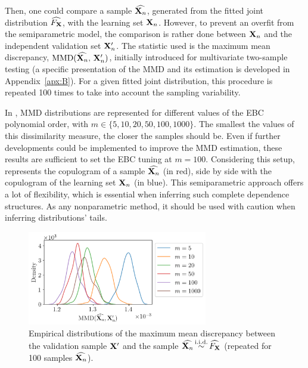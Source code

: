 Then, one could compare a sample $\widehat{{\bf X}_n}$, generated from the fitted joint distribution $\widehat{F_{\bf X}}$, with the learning set ${\bf X}_n$. 
However, to prevent an overfit from the semiparametric model, the comparison is rather done between ${\bf X}_n$ and the independent validation set ${\bf X}_n'$. 
The statistic used is the maximum mean discrepancy, $\mathrm{MMD}(\widehat{{\bf X}_n}, \, {\bf X}_n')$, initially introduced for multivariate two-sample testing (a specific presentation of the MMD and its estimation is developed in Appendix~\ref{apx:B}). 
For a given fitted joint distribution, this procedure is repeated 100 times to take into account the sampling variability. 

In , MMD distributions are represented for different values of the EBC polynomial order, with $m\in\{5, 10, 20, 50, 100, 1000\}$. 
The smallest the values of this dissimilarity measure, the closer the samples should be. 
Even if further developments could be implemented to improve the MMD estimation, these results are sufficient to set the EBC tuning at $m=100$. 
Considering this setup,  represents the copulogram of a sample $\widehat{{\bf X}_n}$ (in red), side by side with the copulogram of the learning set ${\bf X}_n$ (in blue).  
This semiparametric approach offers a lot of flexibility, which is essential when inferring such complete dependence structures. 
As any nonparametric method, it should be used with caution when inferring distributions' tails.  


\begin{figure}[h]
    \centering
    \includegraphics[width=0.7\textwidth]{../numerical_experiments/chapter3/figures/SB_MMD_goodness.png}
    \caption{Empirical distributions of the maximum mean discrepancy between the validation sample ${\bf X}'$ and the sample $\widehat{{\bf X}_n} \mathop{\sim}\limits^{\mathrm{i.i.d.}} \widehat{F_{\bf X}}$ (repeated for 100 samples $\widehat{{\bf X}_n}$).}
    \label{fig:sb_ebc_mmd}
\end{figure}


